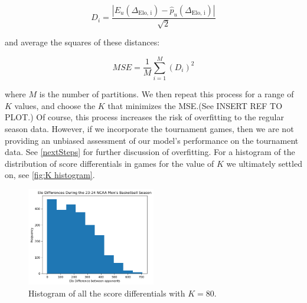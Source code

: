 \documentclass{article}
\begin{document}
\[
D_i = \frac{|E_u(\Delta_{\text{Elo, i}}) - \hat{p}_u(\Delta_{\text{Elo, i}})|}{\sqrt{2}}
\]

and average the squares of these distances:

\[
MSE = \frac{1}{M}\sum_{i=1}^M {(D_i)}^2
\]

where $M$ is the number of partitions. We then repeat this process for a range of $K$ values, and choose the $K$ that minimizes the MSE.\@ (See INSERT REF TO PLOT.) Of course, this process increases the risk of overfitting to the regular season data. However, if we incorporate the tournament games, then we are not providing an unbiased assessment of our model's performance on the tournament data. See \autoref{nextSteps} for further discussion of overfitting. For a histogram of the distribution of score differentials in games for the value of $K$ we ultimately settled on, see \autoref{fig:K histogram}.

\begin{figure}[!htb]
    \begin{center}
      \includegraphics[width=0.5\textwidth]{K histogram.png}
    \end{center}
    \caption{Histogram of all the score differentials with $K=80$.}\label{fig:K histogram}
\end{figure}
\end{document}
